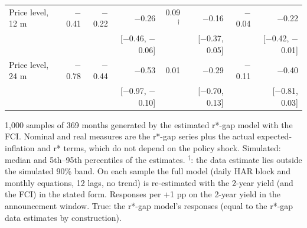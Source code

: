 \begin{table}[p]
\begin{tabular}{lrrrrrrr}
\quad Price level, 12 m & $-$0.41 & $-$0.22 & $-$0.26 & 0.09$^{\dagger}$ & $-$0.16 & $-$0.04 & $-$0.22\\
 &  &  & {\scriptsize [$-$0.46, $-$0.06]} &  & {\scriptsize [$-$0.37, 0.05]} &  & {\scriptsize [$-$0.42, $-$0.01]}\\
\quad Price level, 24 m & $-$0.78 & $-$0.44 & $-$0.53 & 0.01 & $-$0.29 & $-$0.11 & $-$0.40\\
 &  &  & {\scriptsize [$-$0.97, $-$0.10]} &  & {\scriptsize [$-$0.70, 0.13]} &  & {\scriptsize [$-$0.81, 0.03]}\\
\bottomrule\end{tabular}
\par\smallskip\parbox{0.96\linewidth}{\scriptsize 1,000 samples of 369 months generated by the estimated r*-gap model with the FCI. Nominal and real measures are the r*-gap series plus the actual expected-inflation and r* terms, which do not depend on the policy shock. Simulated: median and 5th--95th percentiles of the estimates. $^{\dagger}$: the data estimate lies outside the simulated 90\% band. On each sample the full model (daily HAR block and monthly equations, 12 lags, no trend) is re-estimated with the 2-year yield (and the FCI) in the stated form. Responses per +1 pp on the 2-year yield in the announcement window. True: the r*-gap model's responses (equal to the r*-gap data estimates by construction).}
\end{table}
